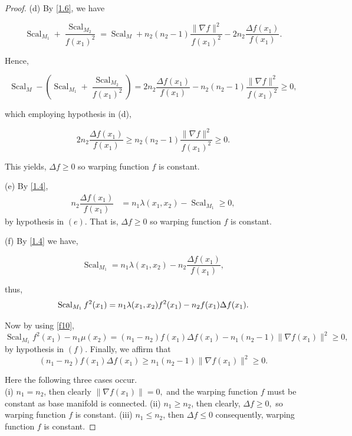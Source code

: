 \documentclass[pdflatex,sn-mathphys-num]{sn-jnl}%
\theoremstyle{thmstyleone}%
\theoremstyle{thmstyletwo}%
\theoremstyle{thmstylethree}%
\begin{document}
\begin{proof}
 {(d)} By \eqref{1.6}, we have
 
 	$$\operatorname{Scal}_{M_1}+\dfrac{\operatorname{Scal}_{M_2}}{f(x_1)^2}=\operatorname{Scal}_M+ n_2(n_2 -1)\dfrac{\|\nabla f\|^2}{f(x_1)^2}-2n_2\frac{\Delta f(x_1)}{f(x_1)}.$$
  
  Hence,
  
 	$$\operatorname{Scal}_M-\left(\operatorname{Scal}_{M_1}+\dfrac{\operatorname{Scal}_{M_2}}{f(x_1)^2}\right)=2n_2\frac{\Delta f(x_1)}{f(x_1)}-n_2(n_2 -1)\dfrac{\|\nabla f\|^2}{f(x_1)^2}\geq 0,$$
  
 which employing hypothesis in (d), 
  
 	$$2n_2\frac{\Delta f(x_1)}{f(x_1)}\geq n_2(n_2 -1)\dfrac{\|\nabla f\|^2}{f(x_1)^2}\geq 0.$$ 

This yields, $\Delta f\geq 0$ so warping function $f$ is constant.\newline

{(e)} By \eqref{1.4}, 
\begin{align*}
	n_2\dfrac{\Delta f(x_1)}{f(x_1)}&= n_1\lambda(x_1,x_2)-\operatorname{Scal}_{M_1}\geq 0,
\end{align*}
by hypothesis in $(e)$.
That is, $\Delta f\geq 0$ so warping function $f$ is constant.\newline

{(f)}
By \eqref{1.4} we have,

		$$\operatorname{Scal}_{M_1} = n_1\lambda(x_1,x_2)- n_2\dfrac{\Delta f(x_1)}{f(x_1)},$$

  thus,
		$$\operatorname{Scal}_{M_1} f^2(x_1) = n_1\lambda(x_1,x_2)f^2(x_1)- n_2f(x_1)\Delta f(x_1).\\$$

Now by using \eqref{f10},
$$\operatorname{Scal}_{M_1}f^2(x_1)-n_1\mu(x_2)=(n_1-n_2)f(x_1)\Delta f(x_1)-n_1(n_2-1)\|\nabla f(x_1)\|^2\geq 0,$$
by hypothesis in $(f)$.
Finally, we affirm that 
$$(n_1-n_2)f(x_1)\Delta f(x_1) \geq n_1(n_2-1)\|\nabla f(x_1)\|^2\geq 0.$$

Here the following three cases occur.\\
{ (i)} $n_1 = n_2$, then clearly 
 $\|\nabla f(x_1)\| = 0,$  and the warping function $f$ must be constant
 as base manifold is connected. \newline
{ (ii)} $n_1 \geq n_2$, then
clearly, $\Delta f \geq  0,$ so warping function $f$ is constant.\newline
{ (iii)} $n_1 \leq n_2$, then 
 $\Delta f \leq 0 $ consequently, warping function $f$ is constant.
\end{proof}
\end{document}
